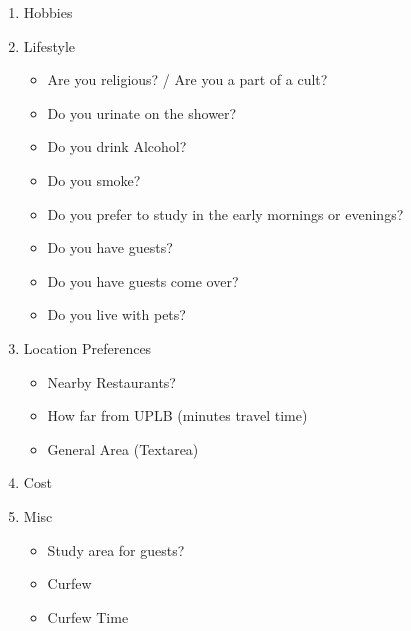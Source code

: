 \documentclass[journal]{./IEEE/IEEEtran}
\begin{document}
\begin{enumerate}
    \item Hobbies
    \item Lifestyle
    \begin{itemize}
        \item Are you religious? / Are you a part of a cult?
        \item Do you urinate on the shower?
        \item Do you drink Alcohol?
        \item Do you smoke?
        \item Do you prefer to study in the early mornings or evenings?
        \item Do you have guests?
        \item Do you have guests come over?
        \item Do you live with pets?
    \end{itemize}

    \item Location Preferences
    \begin{itemize}
        \item Nearby Restaurants?
        \item How far from UPLB (minutes travel time)
        \item General Area (Textarea)
    \end{itemize}

    \item Cost
    \item Misc
    \begin{itemize}
        \item Study area for guests?
        \item Curfew
        \item Curfew Time
    \end{itemize}
\end{enumerate}
\end{document}
